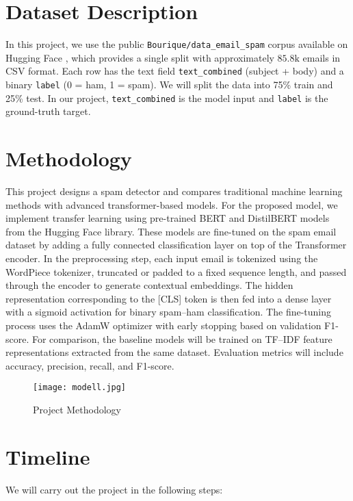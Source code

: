 \documentclass[12pt]{article}
\begin{document}
\section{Dataset Description}
In this project, we use the public \texttt{Bourique/data\_email\_spam} corpus available on Hugging Face \cite{huggingface_dataset}, which provides a single split with approximately $ 85.8\text{k}$ emails in CSV format. Each row has the text field \texttt{text\_combined} (subject + body) and a binary \texttt{label} (0 = ham, 1 = spam). We will split the data into 75\% train and 25\% test. In our project, \texttt{text\_combined} is the model input and \texttt{label} is the ground-truth target.

\section{ Methodology}
This project designs a spam detector and compares traditional machine learning methods with advanced transformer-based models. For the proposed model, we implement transfer learning using pre-trained BERT and DistilBERT models from the Hugging Face library. These models are fine-tuned on the spam email dataset by adding a fully connected classification layer on top of the Transformer encoder. In the preprocessing step, each input email is tokenized using the WordPiece tokenizer, truncated or padded to a fixed sequence length, and passed through the encoder to generate contextual embeddings. The hidden representation corresponding to the [CLS] token is then fed into a dense layer with a sigmoid activation for binary spam–ham classification.
The fine-tuning process uses the AdamW optimizer with early stopping based on validation F1-score. For comparison, the baseline models will be trained on TF–IDF feature representations extracted from the same dataset. Evaluation metrics will include accuracy, precision, recall, and F1-score.

\begin{figure}
    \centering
    \texttt{[image: modell.jpg]}
    \caption{ Project Methodology}
    \label{model}
\end{figure}

\section{Timeline}
We will carry out the project in the following steps:
\end{document}
